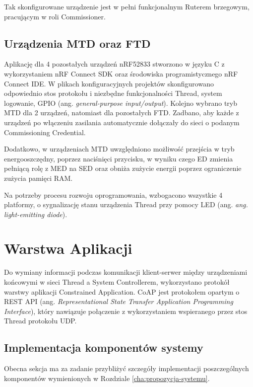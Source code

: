         Tak skonfigurowane urządzenie jest w pełni funkcjonalnym Ruterem brzegowym, pracującym w roli Commissioner.

    \subsection{Urządzenia MTD oraz FTD}
    \label{subsubsec:mtd-ftd-devices-implementation}

    Aplikację dla 4 pozostałych urządzeń nRF52833 stworzono w języku C z wykorzystaniem nRF Connect SDK oraz środowiska programistycznego nRF Connect IDE. W plikach konfiguracyjnych projektów skonfigurowano odpowiednio stos protokołu i niezbędne funkcjonalności Thread, system logowanie, GPIO (ang. \textit{general-purpose input/output}). Kolejno wybrano tryb MTD dla 2 urządzeń, natomiast dla pozostałych FTD. Zadbano, aby każde z urządzeń po włączeniu zasilania automatycznie dołączały do sieci o podanym Commissioning Credential. 

    Dodatkowo, w urządzeniach MTD uwzględniono możliwość przejścia w tryb energooszczędny, poprzez naciśnięci przycisku, w wyniku czego ED zmienia pełniącą rolę z MED na SED oraz obniża zużycie energii poprzez ograniczenie zużycia pamięci RAM.

    Na potrzeby procesu rozwoju oprogramowania, wzbogacono wszystkie 4 platformy, o sygnalizację stanu urządzenia Thread przy pomocy LED (ang. \textit{ang. light-emitting diode}).
    
\section{Warstwa Aplikacji}

    Do wymiany informacji podczas komunikacji klient-serwer między urządzeniami końcowymi w sieci Thread a System Controllerem, wykorzystano protokół warstwy aplikacji Constrained Application. CoAP jest protokołem opartym o REST API (ang. \textit{Representational State Transfer Application Programming Interface}), który nawiązuje połączenie z wykorzystaniem wspieranego przez stos Thread protokołu UDP.

    \subsection{Implementacja komponentów systemy}

        Obecna sekcja ma za zadanie przybliżyć szczegóły implementacji poszczególnych komponentów wymienionych w Rozdziale \ref{cha:propozycja-systemu}.

